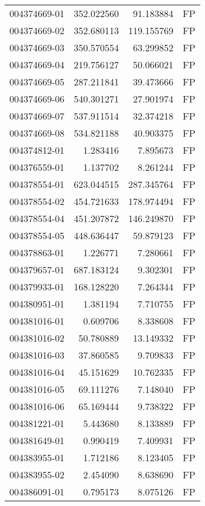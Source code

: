 \begin{tabular}{lrrl}
004374669-01 &  352.022560 &    91.183884 &   FP \\
004374669-02 &  352.680113 &   119.155769 &   FP \\
004374669-03 &  350.570554 &    63.299852 &   FP \\
004374669-04 &  219.756127 &    50.066021 &   FP \\
004374669-05 &  287.211841 &    39.473666 &   FP \\
004374669-06 &  540.301271 &    27.901974 &   FP \\
004374669-07 &  537.911514 &    32.374218 &   FP \\
004374669-08 &  534.821188 &    40.903375 &   FP \\
004374812-01 &    1.283416 &     7.895673 &   FP \\
004376559-01 &    1.137702 &     8.261244 &   FP \\
004378554-01 &  623.044515 &   287.345764 &   FP \\
004378554-02 &  454.721633 &   178.974494 &   FP \\
004378554-04 &  451.207872 &   146.249870 &   FP \\
004378554-05 &  448.636447 &    59.879123 &   FP \\
004378863-01 &    1.226771 &     7.280661 &   FP \\
004379657-01 &  687.183124 &     9.302301 &   FP \\
004379933-01 &  168.128220 &     7.264344 &   FP \\
004380951-01 &    1.381194 &     7.710755 &   FP \\
004381016-01 &    0.609706 &     8.338608 &   FP \\
004381016-02 &   50.780889 &    13.149332 &   FP \\
004381016-03 &   37.860585 &     9.709833 &   FP \\
004381016-04 &   45.151629 &    10.762335 &   FP \\
004381016-05 &   69.111276 &     7.148040 &   FP \\
004381016-06 &   65.169444 &     9.738322 &   FP \\
004381221-01 &    5.443680 &     8.133889 &   FP \\
004381649-01 &    0.990419 &     7.409931 &   FP \\
004383955-01 &    1.712186 &     8.123405 &   FP \\
004383955-02 &    2.454090 &     8.638690 &   FP \\
004386091-01 &    0.795173 &     8.075126 &   FP \\

\end{tabular}
